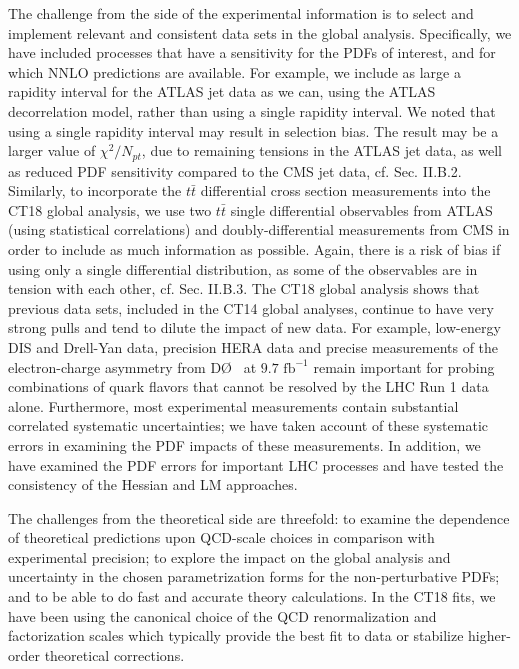 The challenge from the side of the experimental information is to select and implement relevant and consistent data sets in the global analysis. Specifically, we have included processes that have a sensitivity for the PDFs of interest, and for which NNLO predictions are available. 
For example, we include as large a rapidity interval for the ATLAS jet data as we can, using the ATLAS decorrelation model, rather than using a single rapidity interval. We noted that using a single
rapidity interval may result in selection bias. The result may be a larger value of $\chi^2 / N_\mathit{pt}$, due to remaining tensions in the ATLAS jet data, as well as reduced PDF sensitivity compared
to the CMS jet data, cf. Sec. II.B.2.
Similarly, to incorporate the $t \bar t$ differential cross section measurements into the CT18 global analysis,  
we use two $t \bar t$ single differential observables from ATLAS (using statistical correlations) and doubly-differential measurements from CMS in order to include as much information as possible. Again, there is a risk of bias if using only a single differential distribution, as some of the observables are in tension with each other, cf. Sec. II.B.3.
The CT18 global analysis shows that previous data sets, included in the CT14 global analyses, continue to have very strong pulls and tend to dilute the impact of new data. 
For example, low-energy DIS and Drell-Yan data, precision HERA data and precise measurements of the electron-charge asymmetry from D\O~ at $9.7\mbox{ fb}^{-1}$
\cite{D0:2014kma} remain important for probing combinations of quark flavors that cannot be resolved by the LHC Run 1 data alone. Furthermore, most experimental measurements contain
substantial correlated systematic uncertainties; we have taken account of these systematic errors in examining the PDF impacts of these measurements.
In addition, we have examined the PDF errors for important LHC processes and have tested the consistency of the Hessian and LM approaches.


The challenges from the theoretical side are threefold: to examine the dependence of theoretical predictions upon QCD-scale choices in comparison with experimental precision; to explore the
impact on the global analysis and
uncertainty in the chosen parametrization forms for the non-perturbative PDFs; and to be able to do fast and accurate theory calculations. In the CT18 fits, we have been using the canonical
choice of the QCD renormalization and factorization scales which typically provide the best fit to data or stabilize higher-order theoretical corrections.

